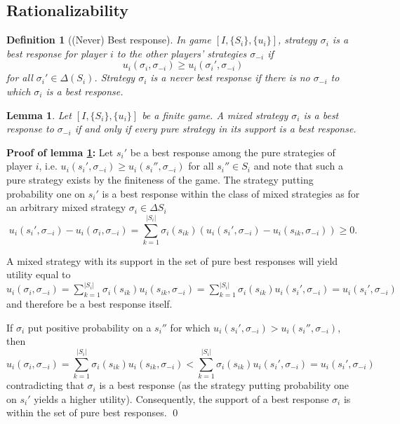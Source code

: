 \documentclass[a4paper,11pt]{article}
\newtheorem{definition}{Definition}
\newtheorem{lemma}{Lemma}
\begin{document}
\subsection{Rationalizability}
\label{sec:rationalizability}

\begin{definition}[(Never) Best response]
In game \([I,\{S_i\},\{u_i\}]\), strategy \(\sigma_i\) is a \emph{best response} for player \(i\) to the other players' strategies \(\sigma_{-i}\) if
$$u_i(\sigma_i,\sigma_{-i})\geq u_i(\sigma_i',\sigma_{-i})$$
for all \(\sigma_i'\in\Delta(S_i)\). Strategy \(\sigma_i\) is a \emph{never best response} if there is no \(\sigma_{-i}\) to which \(\sigma_i\) is a best response.
\end{definition}



\begin{lemma}\label{lem:mixedBRSupport}
Let \([I,\{S_i\},\{u_i\}]\) be a finite game. A mixed strategy $\sigma_i$ is a best response to $\sigma_{-i}$ if and only if every pure strategy in its support is a best response.  
\end{lemma}
\textbf{Proof of lemma \ref{lem:mixedBRSupport}: }
Let $s_i'$ be a best response among the pure strategies of player $i$, i.e. $u_i(s_i',\sigma_{-i})\geq u_i(s_i'',\sigma_{-i})$ for all $s_i''\in S_i$ and note that such a pure strategy exists by the finiteness of the game. The strategy putting probability one on $s_i'$ is a best response within the class of mixed strategies as for an arbitrary mixed strategy $\sigma_i\in\Delta S_i$
\begin{equation*}
  u_i(s_i',\sigma_{-i})-u_i(\sigma_i,\sigma_{-i})=\sum_{k=1}^{|S_i|}\sigma_i(s_{ik})\left(u_i(s_i',\sigma_{-i})-u_i(s_{ik},\sigma_{-i})\right)\geq0.
\end{equation*}

A mixed strategy with its support in the set of pure best responses will yield utility equal to $u_i(\sigma_i,\sigma_{-i})=\sum _{k=1}^{|S_i|}\sigma_i(s_{ik}) u_i(s_{ik},\sigma_{-i})=\sum _{k=1}^{|S_i|}\sigma_i(s_{ik}) u_i(s_i',\sigma_{-i})=u_i(s_i',\sigma_{-i})$ and therefore be a best response itself.

If $\sigma_i$ put positive probability on a $s_i''$ for which $u_i(s_i',\sigma_{-i})> u_i(s_i'',\sigma_{-i})$, then
\begin{equation*}
  u_i(\sigma_i,\sigma_{-i})=\sum_{k=1}^{|S_i|}\sigma_i(s_{ik}) u_i(s_{ik},\sigma_{-i})<\sum_{k=1}^{|S_i|}\sigma_i(s_{ik}) u_i(s_i',\sigma_{-i})=u_i(s_i',\sigma_{-i})
\end{equation*}
contradicting that $\sigma_i$ is a best response (as the strategy putting probability one on $s_i'$ yields a higher utility). Consequently, the support of a best response $\sigma_i$ is within the set of pure best responses.  \qed
\end{document}
